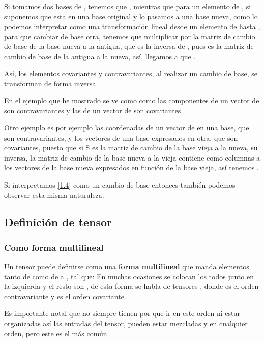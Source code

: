 Si tomamos dos bases de , tenemos que , mientras que para un elemento de , si suponemos que esta en una base original y lo pasamos a una base nueva, como lo podemos interpretar como una transformación lineal desde un elemento de  hasta \lrg{$\R$}, para que cambiar de base otra, tenemos que multiplicar por la matriz de cambio de base de la base nueva a la antigua, que es la inversa de , pues  es la matriz de cambio de base de la antigua a la nueva, así, llegamos a que .

Así, los elementos covariantes y contravariantes, al realizar un cambio de base, se transforman de forma inversa.

En el ejemplo que he mostrado se ve como como las componentes de un vector de  son contravariantes y las de un vector de  son covariantes.

Otro ejemplo es por ejemplo las coordenadas de un vector de  en una base, que son contravariantes, y los vectores de una base expresados en otra, que son covariantes, puesto que si S es la matriz de cambio de la base vieja a la nueva, su inversa, la matriz de cambio de la base nueva a la vieja contiene como columnas a los vectores de la base nueva expresados en función de la base vieja, así tenemos .

Si interpretamos \ref{1.4} como un cambio de base entonces también podemos observar esta misma naturaleza.
\subsection{Definición de tensor}
\subsubsection{Como forma multilineal}
Un tensor puede definirse como una \textbf{forma multilineal} que manda elementos tanto de  como de  a \lrg{$\R$}, tal que:
\lrg{\[T: V^1 \times \dots \times V^k \rightarrow \R \;\;\;\; \; V^i = \{V\mbox{ o }V^*\}\]}
En muchas ocasiones se colocan los  todos junto en la izquierda y el resto son , de esta forma se habla de tensores , donde  es el orden contravariante y  es el orden covariante.

Es importante notal que no siempre tienen por que ir en este orden ni estar organizadas así las entradas del tensor, pueden estar mezcladas y en cualquier orden, pero este es el más común.

